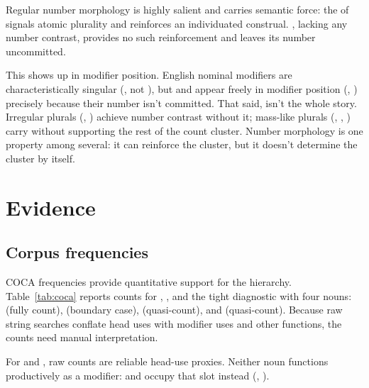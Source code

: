 \documentclass[12pt,a4paper]{article}
\begin{document}
Regular number morphology is highly salient and carries semantic force: the  of  signals atomic plurality and reinforces an individuated construal. , lacking any number contrast, provides no such reinforcement and leaves its number uncommitted.

This shows up in modifier position. English nominal modifiers are characteristically singular (, not ), but  and  appear freely in modifier position (, ) precisely because their number isn't committed. That said,  isn't the whole story. Irregular plurals (, ) achieve number contrast without it; mass-like plurals (, , ) carry  without supporting the rest of the count cluster. Number morphology is one property among several: it can reinforce the cluster, but it doesn't determine the cluster by itself.

\section{Evidence}\label{sec:evidence}

\subsection{Corpus frequencies}\label{sec:corpus}

COCA frequencies \citep{davies2020coca} provide quantitative support for the hierarchy. Table~\ref{tab:coca} reports counts for , , and the tight diagnostic  with four nouns:  (fully count),  (boundary case),  (quasi-count), and  (quasi-count). Because raw string searches conflate head uses with modifier uses and other functions, the counts need manual interpretation.



For  and , raw counts are reliable head-use proxies. Neither noun functions productively as a modifier:  and  occupy that slot instead (, ).
\end{document}
